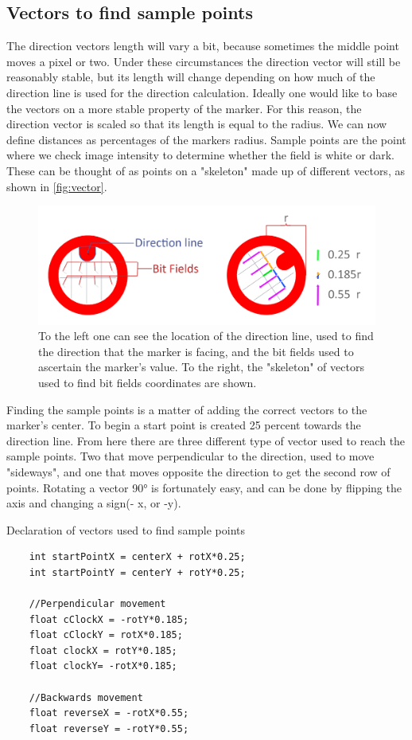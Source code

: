 \subsection{Vectors to find sample points}
The direction vectors length will vary a bit, because sometimes the middle point moves a pixel or two. Under these circumstances the direction vector will still be reasonably stable, but its length will change depending on how much of the direction line is used for the direction calculation. Ideally one would like to base the vectors on a more stable property of the marker. For this reason, the direction vector is scaled so that its length is equal to the radius. We can now define distances as percentages of the markers radius. Sample points are the point where we check image intensity to determine whether the field is white or dark. These can be thought of as points on a "skeleton" made up of different vectors, as shown in \autoref{fig:vector}.
\begin{figure}[H]
	\centering
	\includegraphics[width=1\linewidth]{figure/Analysis/vector.png}
	\caption{To the left one can see the location of the direction line, used to find the direction that the marker is facing, and the bit fields used to ascertain the marker's value. To the right, the "skeleton" of vectors used to find bit fields coordinates are shown.} 
	\label{fig:vector}
\end{figure}
Finding the sample points is a matter of adding the correct vectors to the marker's center. To begin a start point is created 25 percent towards the direction line. From here there are three different type of vector used to reach the sample points. Two that move perpendicular to the direction, used to move "sideways", and one that moves opposite the direction to get the second row of points. Rotating a vector 90° is fortunately easy, and can be done by flipping the axis and changing a sign(- x, or -y).    
\begin{listing}[H]
	\caption{Declaration of vectors used to find sample points}
	\begin{verbatim}
	int startPointX = centerX + rotX*0.25;
	int startPointY = centerY + rotY*0.25;
	
	//Perpendicular movement
	float cClockX = -rotY*0.185;
	float cClockY = rotX*0.185;
	float clockX = rotY*0.185;
	float clockY= -rotX*0.185;
	
	//Backwards movement
	float reverseX = -rotX*0.55;
	float reverseY = -rotY*0.55;
	\end{verbatim}
	\label{listing:vectors}
\end{listing}
